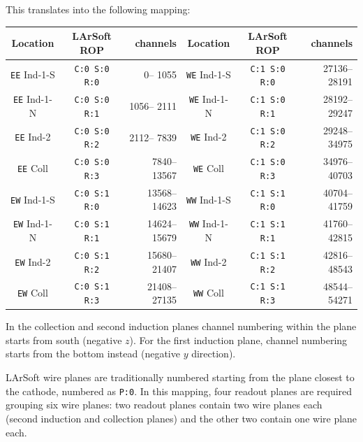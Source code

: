 This translates into the following mapping:
\begin{center}
  \small
  \begin{tabular}{|ccr||ccr|}
    \hline
    \hline
    Location            & LArSoft ROP          & channels     & Location            & LArSoft ROP          & channels     \\
    \hline
    \texttt{EE} Ind-1-S & \texttt{C:0 S:0 R:0} &     0-- 1055 & \texttt{WE} Ind-1-S & \texttt{C:1 S:0 R:0} & 27136--28191 \\
    \texttt{EE} Ind-1-N & \texttt{C:0 S:0 R:1} &  1056-- 2111 & \texttt{WE} Ind-1-N & \texttt{C:1 S:0 R:1} & 28192--29247 \\
    \texttt{EE} Ind-2   & \texttt{C:0 S:0 R:2} &  2112-- 7839 & \texttt{WE} Ind-2   & \texttt{C:1 S:0 R:2} & 29248--34975 \\
    \texttt{EE} Coll    & \texttt{C:0 S:0 R:3} &  7840--13567 & \texttt{WE} Coll    & \texttt{C:1 S:0 R:3} & 34976--40703 \\
    \hline
    \texttt{EW} Ind-1-S & \texttt{C:0 S:1 R:0} & 13568--14623 & \texttt{WW} Ind-1-S & \texttt{C:1 S:1 R:0} & 40704--41759 \\
    \texttt{EW} Ind-1-N & \texttt{C:0 S:1 R:1} & 14624--15679 & \texttt{WW} Ind-1-N & \texttt{C:1 S:1 R:1} & 41760--42815 \\
    \texttt{EW} Ind-2   & \texttt{C:0 S:1 R:2} & 15680--21407 & \texttt{WW} Ind-2   & \texttt{C:1 S:1 R:2} & 42816--48543 \\
    \texttt{EW} Coll    & \texttt{C:0 S:1 R:3} & 21408--27135 & \texttt{WW} Coll    & \texttt{C:1 S:1 R:3} & 48544--54271 \\
    \hline
    \hline
  \end{tabular}
\end{center}
In the collection and second induction planes channel numbering within the plane
starts from south (negative $z$).
For the first induction plane, channel numbering starts from the bottom instead
(negative $y$ direction).

LArSoft wire planes are traditionally numbered starting from the plane closest
to the cathode, numbered as \texttt{P:0}.
In this mapping, four readout planes are required grouping six wire planes:
two readout planes contain two wire planes each (second induction and collection planes)
and the other two contain one wire plane each.

